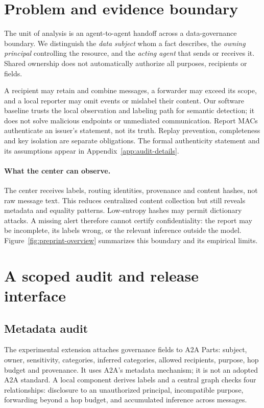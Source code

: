 \section{Problem and evidence boundary}\label{sec:threat}
The unit of analysis is an agent-to-agent handoff across a data-governance
boundary. We distinguish the \emph{data subject} whom a fact describes, the
\emph{owning principal} controlling the resource, and the \emph{acting agent}
that sends or receives it. Shared ownership does not automatically authorize
all purposes, recipients or fields.

A recipient may retain and combine messages, a forwarder may exceed its scope,
and a local reporter may omit events or mislabel their content. Our software
baseline trusts the local observation and labeling path for semantic detection;
it does not solve malicious endpoints or unmediated communication. Report MACs
authenticate an issuer's statement, not its truth. Replay prevention, completeness
and key isolation are separate obligations. The formal authenticity statement
and its assumptions appear in Appendix~\ref{app:audit-details}.

\paragraph{What the center can observe.}
The center receives labels, routing identities, provenance and content hashes,
not raw message text. This reduces centralized content collection but still
reveals metadata and equality patterns. Low-entropy hashes may permit dictionary
attacks. A missing alert therefore cannot certify confidentiality: the report
may be incomplete, its labels wrong, or the relevant inference outside the model.
Figure~\ref{fig:preprint-overview} summarizes this boundary and its empirical limits.

\section{A scoped audit and release interface}\label{sec:ext}
\subsection{Metadata audit}\label{sec:auditor}
The experimental \ext{} extension attaches governance fields to A2A Parts:
subject, owner, sensitivity, categories, inferred categories, allowed recipients,
purpose, hop budget and provenance. It uses A2A's metadata mechanism; it is not
an adopted A2A standard. A local component derives labels and a central graph
checks four relationships: disclosure to an unauthorized principal, incompatible
purpose, forwarding beyond a hop budget, and accumulated inference across messages.


